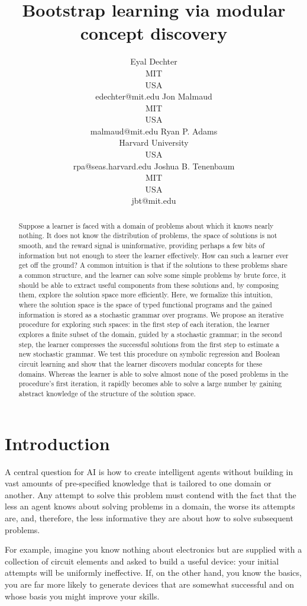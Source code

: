 \documentclass{article}
\title{Bootstrap learning via modular concept discovery}
\author{Eyal Dechter \\
MIT\\
USA \\
edechter@mit.edu
\And
Jon Malmaud \\
MIT \\ 
USA \\
malmaud@mit.edu
\And 
Ryan P.  Adams \\
Harvard University\\
USA \\
rpa@seas.harvard.edu
\And
Joshua B. Tenenbaum \\
MIT\\
USA \\
jbt@mit.edu
}
\begin{document}
\maketitle
\begin{abstract}
 Suppose a learner is faced with a domain of problems about which it
 knows nearly nothing. It does not know the distribution of problems,
 the space of solutions is not smooth, and the reward signal is
 uninformative, providing perhaps a few bits of information but not
 enough to steer the learner effectively. How can such a learner ever
 get off the ground? A common intuition is that if the solutions to
 these problems share a common structure, and the learner can solve
 some simple problems by brute force, it should be able to extract
 useful components from these solutions and, by composing them,
 explore the solution space more efficiently. Here, we formalize this
 intuition, where the solution space is the space of typed functional
 programs and the gained information is stored as a stochastic grammar
 over programs. We propose an iterative procedure for exploring such
 spaces: in the first step of each iteration, the learner explores a
 finite subset of the domain, guided by a stochastic grammar; in the
 second step, the learner compresses the successful solutions from the
 first step to estimate a new stochastic grammar. We test this
 procedure on symbolic regression and Boolean circuit learning and
 show that the learner discovers modular concepts for these
 domains. Whereas the learner is able to solve almost none of the
 posed problems in the procedure's first iteration, it rapidly becomes
 able to solve a large number by gaining abstract knowledge of the
 structure of the solution space.
 
 
\end{abstract}

\section{Introduction}
A central question for AI is how to create intelligent agents without
building in vast amounts of pre-specified knowledge that is tailored
to one domain or another. Any attempt to solve this problem must
contend with the fact that the less an agent knows about solving
problems in a domain, the worse its attempts are, and, therefore, the
less informative they are about how to solve subsequent problems. 

For example, imagine you know nothing about electronics but are
supplied with a collection of circuit elements and asked to build a
useful device: your initial attempts will be uniformly
ineffective. If, on the other hand, you know the basics, you are far
more likely to generate devices that are somewhat successful and on
whose basis you might improve your skills.
\end{document}
